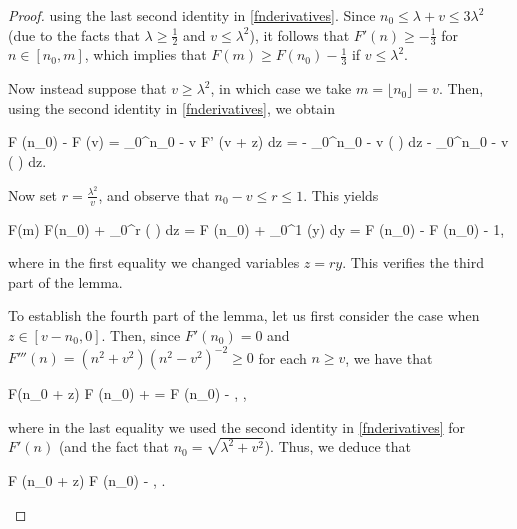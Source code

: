 \documentclass[10pt,a4paper]{article}
\theoremstyle{plain}\newtheorem{theorem}{Theorem}
\theoremstyle{definition}
\begin{document}
\begin{proof}
	\noindent using the last second identity in \eqref{fnderivatives}. Since $n_0 \le \lambda + v \le 3 \lambda^2$ (due to the facts that $\lambda \ge \frac{1}{2}$ and $v \le \lambda^2$), it follows that $F' (n) \ge -\frac{1}{3}$ for $n \in [n_0, m]$, which implies that $F (m) \ge F(n_0) - \frac{1}{3}$ if $v \le \lambda^2$. 
	
	Now instead suppose that $v \ge \lambda^2$, in which case we take $m = \lfloor n_0 \rfloor = v$. Then, using the second identity in \eqref{fnderivatives}, we obtain
	\begin{flalign*}
	F (n_0) - F (v) = \displaystyle\int_0^{n_0 - v} F' (v + z) dz = - \displaystyle{} \displaystyle\int_0^{n_0 - v} \log \bigg( \displaystyle{} \bigg) dz \le  - \displaystyle{} \displaystyle\int_0^{n_0 - v} \log \bigg( \displaystyle{} \bigg) dz.
	\end{flalign*}
	
	\noindent Now set $r = \frac{\lambda^2}{v}$, and observe that $n_0 - v \le r \le 1$. This yields 
	\begin{flalign*}
	F(m) \ge F(n_0) + \displaystyle{} \displaystyle\int_0^r \log \bigg( \displaystyle{} \bigg) dz = F (n_0) +  \displaystyle{} \displaystyle\int_0^1 (\log y) dy = F (n_0) - \displaystyle{} \ge F (n_0) - 1,
	\end{flalign*} 
	
	\noindent where in the first equality we changed variables $z = ry$. This verifies the third part of the lemma. 
	
	To establish the fourth part of the lemma, let us first consider the case when $z \in [v - n_0, 0]$. Then, since $F' (n_0) = 0$ and $F''' (n) = (n^2 + v^2) (n^2 - v^2)^{-2} \ge 0$ for each $n \ge v$, we have that 
	\begin{flalign*}
	F(n_0 + z) \le F (n_0) + \displaystyle{} = F (n_0) - \displaystyle{}, \quad \text{for $z \in [v - n_0, 0]$},
	\end{flalign*} 
	
	\noindent where in the last equality we used the second identity in \eqref{fnderivatives} for $F' (n)$ (and the fact that $n_0 = \sqrt{\lambda^2 + v^2}$). Thus, we deduce that
	\begin{flalign}
	\label{fn0zn01}
	F (n_0 + z) \le F (n_0) - \displaystyle{}, \quad {}.
	\end{flalign}
	

\end{proof}
\end{document}
